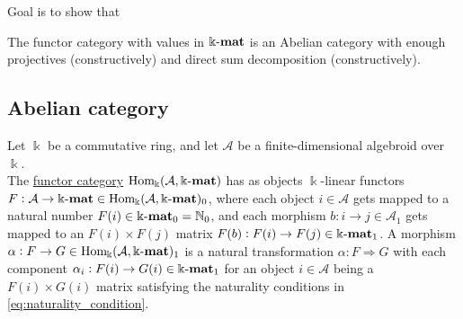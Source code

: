 \label{sect:abelian_cat}
Goal is to show that

The functor category with values in $\Bbbk\textnormal{-}\mathbf{mat}$ is an Abelian category with enough projectives (constructively) and direct sum decomposition (constructively).

\subsection{Abelian category}

\begin{definition}
Let $\Bbbk$ be a commutative ring, and let $\mathcal{A}$ be a finite-dimensional algebroid over $\Bbbk$.\\
The \ul{functor category} $\mathrm{Hom_{\Bbbk}}(\mathcal{A},\Bbbk\textnormal{-}\mathbf{mat})$ has as objects $\Bbbk$-linear functors $F : \mathcal{A} \rightarrow \Bbbk\textnormal{-}\mathbf{mat} \in \mathrm{Hom_{\Bbbk}}(\mathcal{A},\Bbbk\textnormal{-}\mathbf{mat})_{0}$, where each
object $i \in \mathcal{A}$ gets mapped to a natural number $F(i) \in \Bbbk\textnormal{-}\mathbf{mat}_{0} = \mathbb{N}_{0}$, and each
morphism $b : i \rightarrow j \in \mathcal{A}_{1}$ gets mapped to an $F(i) \times F(j)$ matrix $F(b) : F(i) \rightarrow F(j) \in \Bbbk\textnormal{-}\mathbf{mat}_{1}$.
A morphism $\alpha : F \rightarrow G \in \mathrm{Hom_{\Bbbk}}(\mathcal{A},\Bbbk\textnormal{-}\mathbf{mat})_{1}$ is a natural transformation $\alpha : F \Rightarrow G$ with each component
$\alpha_{i} : F(i) \rightarrow G(i) \in \Bbbk\textnormal{-}\mathbf{mat}_{1}$ for an object $i \in \mathcal{A}$ being a $F(i) \times G(i)$ matrix satisfying the
naturality conditions in \eqref{eq:naturality_condition}.
\end{definition}

